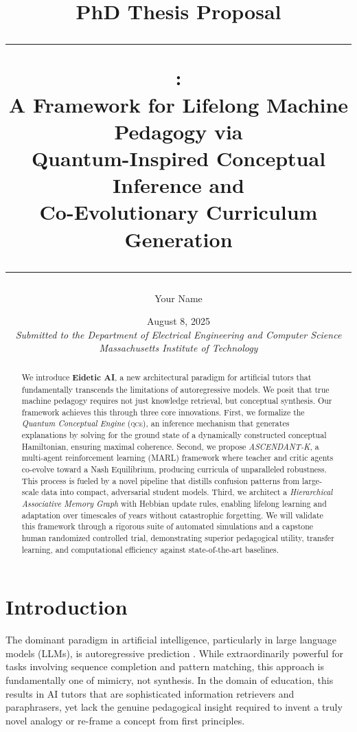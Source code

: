 \documentclass[12pt,oneside]{report}
\title{
  \vspace{-1.5cm}
  \begin{flushright}
  \normalsize{PhD Thesis Proposal}
  \end{flushright}
  \vspace{1.5cm}
  \hrule
  \vspace{0.4cm}
  \textbf{\huge \eideticai:}\\[0.2cm]
  \Large A Framework for Lifelong Machine Pedagogy via\\[0.1cm] Quantum-Inspired Conceptual Inference and\\[0.1cm] Co-Evolutionary Curriculum Generation
  \vspace{0.4cm}
  \hrule
}
\author{Your Name}
\date{August 8, 2025\\[1cm]
  \textit{Submitted to the Department of Electrical Engineering and Computer Science}\\
  \textit{Massachusetts Institute of Technology}
}
\newcommand{\framework}[1]{\textsc{#1}}
\newcommand{\qce}{\framework{qce}}
\theoremstyle{definition}
\theoremstyle{plain}
\theoremstyle{remark}
\begin{document}
\begin{titlepage}
  \maketitle
  \thispagestyle{empty}
\end{titlepage}

\begin{abstract}
\noindent We introduce \textbf{Eidetic AI}, a new architectural paradigm for artificial tutors that fundamentally transcends the limitations of autoregressive models. We posit that true machine pedagogy requires not just knowledge retrieval, but conceptual synthesis. Our framework achieves this through three core innovations. First, we formalize the \emph{Quantum Conceptual Engine} (\qce), an inference mechanism that generates explanations by solving for the ground state of a dynamically constructed conceptual Hamiltonian, ensuring maximal coherence. Second, we propose \emph{ASCENDANT-K}, a multi-agent reinforcement learning (MARL) framework where teacher and critic agents co-evolve toward a Nash Equilibrium, producing curricula of unparalleled robustness. This process is fueled by a novel pipeline that distills confusion patterns from large-scale data into compact, adversarial student models. Third, we architect a \emph{Hierarchical Associative Memory Graph} with Hebbian update rules, enabling lifelong learning and adaptation over timescales of years without catastrophic forgetting. We will validate this framework through a rigorous suite of automated simulations and a capstone human randomized controlled trial, demonstrating superior pedagogical utility, transfer learning, and computational efficiency against state-of-the-art baselines.
\end{abstract}

\clearpage
\tableofcontents
\clearpage
\listoffigures
\listoftables
\clearpage


\chapter{Introduction}
The dominant paradigm in artificial intelligence, particularly in large language models (LLMs), is autoregressive prediction \cite{vaswani2017attention}. While extraordinarily powerful for tasks involving sequence completion and pattern matching, this approach is fundamentally one of mimicry, not synthesis. In the domain of education, this results in AI tutors that are sophisticated information retrievers \cite{lewis2020retrieval} and paraphrasers, yet lack the genuine pedagogical insight required to invent a truly novel analogy or re-frame a concept from first principles.
\end{document}
